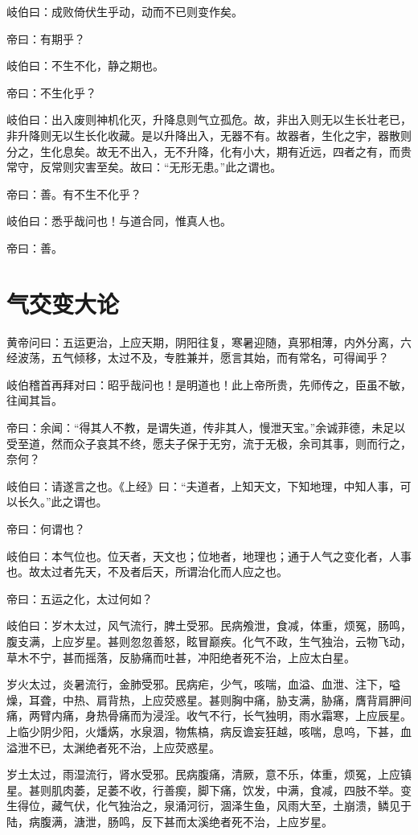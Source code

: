 \documentclass{article}%
\begin{document}
岐伯曰：成败倚伏生乎动，动而不已则变作矣。

帝曰：有期乎？

岐伯曰：不生不化，静之期也。

帝曰：不生化乎？

岐伯曰：出入废则神机化灭，升降息则气立孤危。故，非出入则无以生长壮老已，非升降则无以生长化收藏。是以升降出入，无器不有。故器者，生化之宇，器散则分之，生化息矣。故无不出入，无不升降，化有小大，期有近远，四者之有，而贵常守，反常则灾害至矣。故曰：“无形无患。”此之谓也。

帝曰：善。有不生不化乎？

岐伯曰：悉乎哉问也！与道合同，惟真人也。

帝曰：善。
\section{气交变大论}
黄帝问曰：五运更治，上应天期，阴阳往复，寒暑迎随，真邪相薄，内外分离，六经波荡，五气倾移，太过不及，专胜兼并，愿言其始，而有常名，可得闻乎？

岐伯稽首再拜对曰：昭乎哉问也！是明道也！此上帝所贵，先师传之，臣虽不敏，往闻其旨。

帝曰：余闻：“得其人不教，是谓失道，传非其人，慢泄天宝。”余诚菲德，未足以受至道，然而众子哀其不终，愿夫子保于无穷，流于无极，余司其事，则而行之，奈何？

岐伯曰：请遂言之也。《上经》曰：“夫道者，上知天文，下知地理，中知人事，可以长久。”此之谓也。

帝曰：何谓也？

岐伯曰：本气位也。位天者，天文也；位地者，地理也；通于人气之变化者，人事也。故太过者先天，不及者后天，所谓治化而人应之也。

帝曰：五运之化，太过何如？

岐伯曰：岁木太过，风气流行，脾土受邪。民病飧泄，食减，体重，烦冤，肠鸣，腹支满，上应岁星。甚则忽忽善怒，眩冒巅疾。化气不政，生气独治，云物飞动，草木不宁，甚而摇落，反胁痛而吐甚，冲阳绝者死不治，上应太白星。

岁火太过，炎暑流行，金肺受邪。民病疟，少气，咳喘，血溢、血泄、注下，嗌燥，耳聋，中热、肩背热，上应荧惑星。甚则胸中痛，胁支满，胁痛，膺背肩胛间痛，两臂内痛，身热骨痛而为浸淫。收气不行，长气独明，雨水霜寒，上应辰星。上临少阴少阳，火燔焫，水泉涸，物焦槁，病反谵妄狂越，咳喘，息呜，下甚，血溢泄不已，太渊绝者死不治，上应荧惑星。

岁土太过，雨湿流行，肾水受邪。民病腹痛，清厥，意不乐，体重，烦冤，上应镇星。甚则肌肉萎，足萎不收，行善瘈，脚下痛，饮发，中满，食减，四肢不举。变生得位，藏气伏，化气独治之，泉涌河衍，涸泽生鱼，风雨大至，土崩溃，鳞见于陆，病腹满，溏泄，肠鸣，反下甚而太溪绝者死不治，上应岁星。
\end{document}
